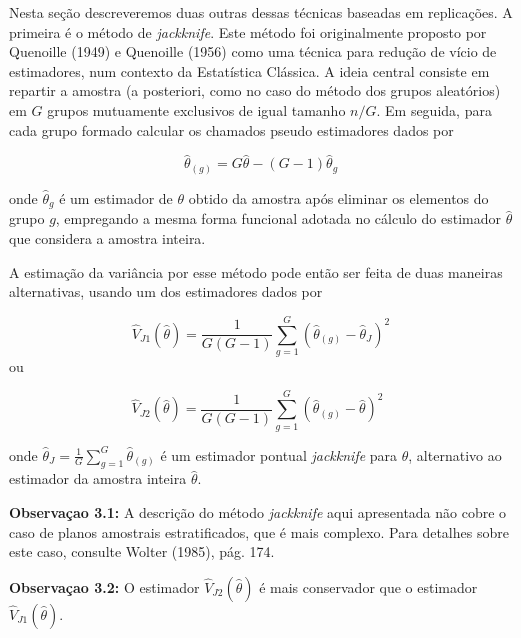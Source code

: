 \documentclass[
  12pt,
  brazilian,
]{book}
\theoremstyle{definition}
\theoremstyle{definition}
\theoremstyle{definition}
\theoremstyle{definition}
\theoremstyle{remark}
\begin{document}
Nesta seção descreveremos duas outras dessas técnicas baseadas em replicações. A primeira é o método de \emph{jackknife}. Este método foi originalmente proposto por Quenoille (1949) e Quenoille (1956) como uma técnica para redução de vício de estimadores, num contexto da Estatística Clássica. A ideia central consiste em repartir a amostra (a posteriori, como no caso do método dos grupos aleatórios) em \(G\) grupos mutuamente exclusivos de igual tamanho \(n/G\). Em seguida, para cada grupo formado calcular os chamados pseudo estimadores dados por

\[
\widehat{\theta }_{\left( g\right) }=G\widehat{\theta }-\left( G-1\right) 
\widehat{\theta }_{g} 
\]

onde \(\widehat{\theta }_{g}\) é um estimador de \(\theta\) obtido da amostra após eliminar os elementos do grupo \(g\), empregando a mesma forma funcional adotada no cálculo do estimador \(\widehat{\theta}\) que considera a amostra inteira.

A estimação da variância por esse método pode então ser feita de duas maneiras alternativas, usando um dos estimadores dados por

\begin{equation}
\widehat{V}_{J1}\left( \widehat{\theta }\right) =\frac{1}{G\left( G-1\right) 
}\sum_{g=1}^{G}\left( \widehat{\theta }_{\left( g\right) }-\widehat{\theta }
_{J}\right) ^{2}  \label{eq:estpa27}
\end{equation}
ou

\begin{equation}
\widehat{V}_{J2}\left( \widehat{\theta }\right) =\frac{1}{G\left( G-1\right) 
}\sum_{g=1}^{G}\left( \widehat{\theta }_{\left( g\right) }-\widehat{\theta }
\right) ^{2} \,\,\, \label{eq:estpa28}
\end{equation}

onde \(\widehat{\theta }_{J} = \frac{1}{G} \sum_{g=1}^{G} \widehat{\theta }_{\left( g\right)}\) é um estimador pontual \emph{jackknife} para \(\theta\), alternativo ao estimador da amostra inteira \(\hat{\theta}\).

\textbf{Observaçao 3.1:} A descrição do método \emph{jackknife} aqui apresentada não cobre o caso de planos amostrais estratificados, que é mais complexo. Para detalhes sobre este caso, consulte Wolter (1985), pág. 174.

\textbf{Observaçao 3.2:} O estimador \(\widehat{V}_{J2}\left( \widehat{\theta }\right)\) é mais conservador que o estimador \(\widehat{V}_{J1}\left( \widehat{\theta }\right)\).
\end{document}
